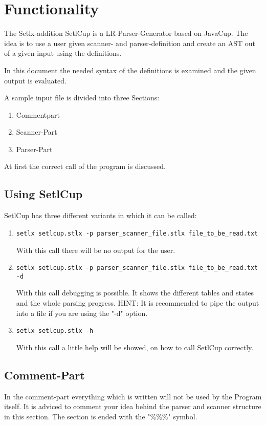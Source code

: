 \chapter{Functionality}

The Setlx-addition SetlCup is a LR-Parser-Generator based on JavaCup.
The idea is to use a user given scanner- and parser-definition and create an AST out of a given input using the definitions.

In this document the needed syntax of the definitions is examined and the given output is evaluated.

A sample input file is divided into three Sections:
\begin{enumerate}
	\item Commentpart
	\item Scanner-Part
	\item Parser-Part
\end{enumerate}

At first the correct call of the program is discussed.
\section{Using SetlCup}
SetlCup has three different variants in which it can be called:
\begin{enumerate}
	\item \begin{verbatim}setlx setlcup.stlx -p parser_scanner_file.stlx file_to_be_read.txt \end{verbatim}
			With this call there will be no output for the user.
	\item \begin{verbatim}setlx setlcup.stlx -p parser_scanner_file.stlx file_to_be_read.txt -d\end{verbatim}
			With this call debugging is possible. It shows the different tables and states and the whole parsing progress. HINT: It is recommended to pipe the output into a file if you are using the "-d" option.
	\item \begin{verbatim}setlx setlcup.stlx -h\end{verbatim}
			With this call a little help will be showed, on how to call SetlCup correctly.
\end{enumerate}
\section{Comment-Part}
In the comment-part everything which is written will not be used by the Program itself. It is adviced to comment your idea behind the parser and scanner structure in this section.
The section is ended with the "\%\%\%" symbol.

